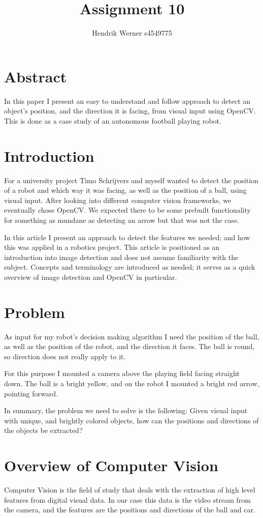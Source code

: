 \documentclass[12pt, a4paper]{article}
\title{Assignment 10}
\author{Hendrik Werner s4549775}
\begin{document}
\maketitle

\section{Abstract}
In this paper I present an easy to understand and follow approach to detect an object's position, and the direction it is facing, from visual input using OpenCV. This is done as a case study of an autonomous football playing robot.

\section{Introduction}
For a university project Timo Schrijvers and myself wanted to detect the position of a robot and which way it was facing, as well as the position of a ball, using visual input. After looking into different computer vision frameworks, we eventually chose OpenCV. We expected there to be some prebuilt functionality for something as mundane as detecting an arrow but that was not the case.

In this article I present an approach to detect the features we needed; and how this was applied in a robotics project. This article is positioned as an introduction into image detection and does not assume familiarity with the subject. Concepts and terminology are introduced as needed; it serves as a quick overview of image detection and OpenCV in particular.

\section{Problem}
As input for my robot's decision making algorithm I need the position of the ball, as well as the position of the robot, and the direction it faces. The ball is round, so direction does not really apply to it.

For this purpose I mounted a camera above the playing field facing straight down. The ball is a bright yellow, and on the robot I mounted a bright red arrow, pointing forward.

In summary, the problem we need to solve is the following: Given visual input with unique, and brightly colored objects, how can the positions and directions of the objects be extracted?

\section{Overview of Computer Vision}
Computer Vision is the field of study that deals with the extraction of high level features from digital visual data. In our case this data is the video stream from the camera, and the features are the positions and directions of the ball and car.
\end{document}
